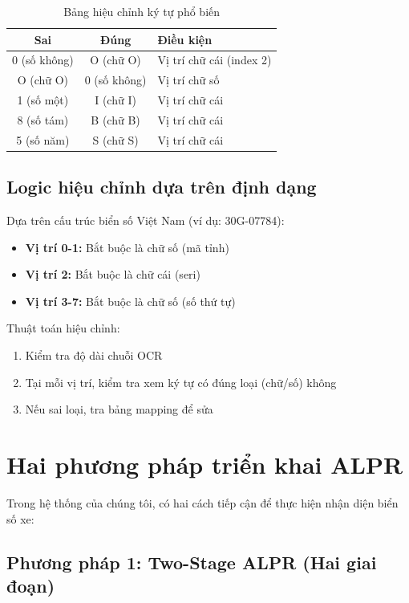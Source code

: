 \begin{table}[!ht]
\centering
\caption{Bảng hiệu chỉnh ký tự phổ biến}
\label{tab:char_correction}
\begin{tabular}{|c|c|l|}
\hline
\textbf{Sai} & \textbf{Đúng} & \textbf{Điều kiện} \\ \hline
0 (số không) & O (chữ O) & Vị trí chữ cái (index 2) \\ \hline
O (chữ O) & 0 (số không) & Vị trí chữ số \\ \hline
1 (số một) & I (chữ I) & Vị trí chữ cái \\ \hline
8 (số tám) & B (chữ B) & Vị trí chữ cái \\ \hline
5 (số năm) & S (chữ S) & Vị trí chữ cái \\ \hline
\end{tabular}
\end{table}

\subsection{Logic hiệu chỉnh dựa trên định dạng}
Dựa trên cấu trúc biển số Việt Nam (ví dụ: 30G-07784):
\begin{itemize}
    \item \textbf{Vị trí 0-1:} Bắt buộc là chữ số (mã tỉnh)
    \item \textbf{Vị trí 2:} Bắt buộc là chữ cái (seri)
    \item \textbf{Vị trí 3-7:} Bắt buộc là chữ số (số thứ tự)
\end{itemize}

Thuật toán hiệu chỉnh:
\begin{enumerate}
    \item Kiểm tra độ dài chuỗi OCR
    \item Tại mỗi vị trí, kiểm tra xem ký tự có đúng loại (chữ/số) không
    \item Nếu sai loại, tra bảng mapping để sửa
\end{enumerate}

\section{Hai phương pháp triển khai ALPR}

Trong hệ thống của chúng tôi, có hai cách tiếp cận để thực hiện nhận diện biển số xe:

\subsection{Phương pháp 1: Two-Stage ALPR (Hai giai đoạn)}

